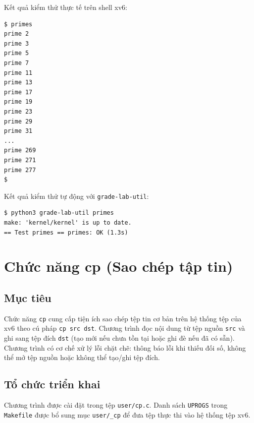 \noindent Kết quả kiểm thử thực tế trên shell xv6:

\begin{center}
\begin{minipage}{0.86\textwidth}
\begin{lstlisting}[numbers=none,xleftmargin=0pt,framexleftmargin=0pt]
$ primes
prime 2
prime 3
prime 5
prime 7
prime 11
prime 13
prime 17
prime 19
prime 23
prime 29
prime 31
...
prime 269
prime 271
prime 277
$
\end{lstlisting}
\end{minipage}
\end{center}

\noindent Kết quả kiểm thử tự động với \texttt{grade-lab-util}:

\begin{center}
\begin{minipage}{0.86\textwidth}
\begin{lstlisting}[numbers=none,xleftmargin=0pt,framexleftmargin=0pt]
$ python3 grade-lab-util primes
make: 'kernel/kernel' is up to date.
== Test primes == primes: OK (1.3s) 
\end{lstlisting}
\end{minipage}
\end{center}

\section{Chức năng cp (Sao chép tập tin)}

\subsection{Mục tiêu}
Chức năng \texttt{cp} cung cấp tiện ích sao chép tệp tin cơ bản trên hệ thống tệp của xv6 theo cú pháp \texttt{cp src dst}. Chương trình đọc nội dung từ tệp nguồn \texttt{src} và ghi sang tệp đích \texttt{dst} (tạo mới nếu chưa tồn tại hoặc ghi đè nếu đã có sẵn). Chương trình có cơ chế xử lý lỗi chặt chẽ: thông báo lỗi khi thiếu đối số, không thể mở tệp nguồn hoặc không thể tạo/ghi tệp đích.

\subsection{Tổ chức triển khai}
Chương trình được cài đặt trong tệp \texttt{user/cp.c}. Danh sách \texttt{UPROGS} trong \texttt{Makefile} được bổ sung mục \texttt{user/\_cp} để đưa tệp thực thi vào hệ thống tệp xv6.

